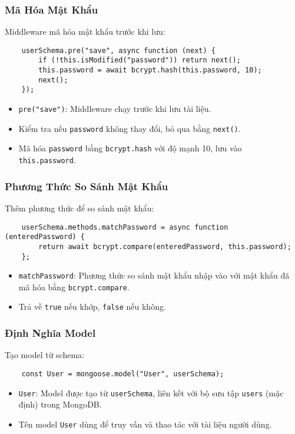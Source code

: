             \subsubsection{Mã Hóa Mật Khẩu}
                \hspace*{0.6cm}Middleware mã hóa mật khẩu trước khi lưu:
                \begin{lstlisting}
    userSchema.pre("save", async function (next) {
        if (!this.isModified("password")) return next();
        this.password = await bcrypt.hash(this.password, 10);
        next();
    });
                \end{lstlisting}
                \begin{itemize}
                    \item \texttt{pre("save")}: Middleware chạy trước khi lưu tài liệu.
                    \item Kiểm tra nếu \texttt{password} không thay đổi, bỏ qua bằng \texttt{next()}.
                    \item Mã hóa \texttt{password} bằng \texttt{bcrypt.hash} với độ mạnh 10, lưu vào \texttt{this.password}.
                \end{itemize}

            \subsubsection{Phương Thức So Sánh Mật Khẩu}
                \hspace*{0.6cm}Thêm phương thức để so sánh mật khẩu:
                \begin{lstlisting}
    userSchema.methods.matchPassword = async function (enteredPassword) {
        return await bcrypt.compare(enteredPassword, this.password);
    };
                \end{lstlisting}
                \begin{itemize}
                    \item \texttt{matchPassword}: Phương thức so sánh mật khẩu nhập vào với mật khẩu đã mã hóa bằng \texttt{bcrypt.compare}.
                    \item Trả về \texttt{true} nếu khớp, \texttt{false} nếu không.
                \end{itemize}

            \subsubsection{Định Nghĩa Model}
                \hspace*{0.6cm}Tạo model từ schema:
                \begin{lstlisting}
    const User = mongoose.model("User", userSchema);
                \end{lstlisting}
                \begin{itemize}
                    \item \texttt{User}: Model được tạo từ \texttt{userSchema}, liên kết với bộ sưu tập \texttt{users} (mặc định) trong MongoDB.
                    \item Tên model \texttt{User} dùng để truy vấn và thao tác với tài liệu người dùng.
                \end{itemize}

